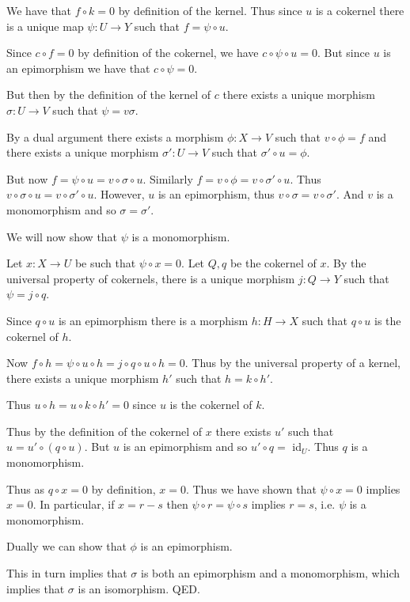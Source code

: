 \documentclass[12pt]{article}
\begin{document}
We have that $f\circ k = 0$ by definition of the kernel. Thus since $u$ is a cokernel there is a unique map $\psi : U \to Y$ such that $f = \psi\circ u$.

Since $c\circ f = 0$ by definition of the cokernel, we have $c\circ \psi\circ u = 0$. But since $u$ is an epimorphism we have that $c\circ \psi = 0$.

But then by the definition of the kernel of $c$ there exists a unique morphism $\sigma : U \to V$ such that $\psi = v\sigma$.

By a dual argument there exists a morphism $\phi : X \to V$ such that $v\circ \phi = f$ and there exists a unique morphism $\sigma' : U \to V$ such that $\sigma'\circ u = \phi$.

But now $f = \psi\circ u = v\circ \sigma\circ u$. Similarly $f = v\circ \phi = v\circ \sigma'\circ u$. Thus $v\circ \sigma\circ u = v\circ \sigma'\circ u$. However, $u$ is an epimorphism, thus $v\circ \sigma = v\circ \sigma'$. And $v$ is a monomorphism and so $\sigma = \sigma'$.

We will now show that $\psi$ is a monomorphism.

Let $x : X \to U$ be such that $\psi\circ x = 0$. Let $Q, q$ be the cokernel of $x$. By the universal property of cokernels, there is a unique morphism $j : Q \to Y$ such that $\psi = j\circ q$.

Since $q\circ u$ is an epimorphism there is a morphism $h : H \to X$ such that $q\circ u$ is the cokernel of $h$.

Now $f\circ h = \psi\circ u\circ h = j\circ q\circ u\circ h = 0$. Thus by the universal property of a kernel, there exists a unique morphism $h'$ such that $h = k\circ h'$.

Thus $u\circ h = u\circ k\circ h' = 0$ since $u$ is the cokernel of $k$.

Thus by the definition of the cokernel of $x$ there exists $u'$ such that $u = u'\circ (q\circ u)$. But $u$ is an epimorphism and so $u'\circ q =$ id$_U$. Thus $q$ is a monomorphism.

Thus as $q\circ x = 0$ by definition, $x = 0$. Thus we have shown that $\psi\circ x = 0$ implies $x = 0$. In particular, if $x = r - s$ then $\psi\circ r = \psi\circ s$ implies $r = s$, i.e. $\psi$ is a monomorphism.

Dually we can show that $\phi$ is an epimorphism.

This in turn implies that $\sigma$ is both an epimorphism and a monomorphism, which implies that $\sigma$ is an isomorphism. QED.
\end{document}
